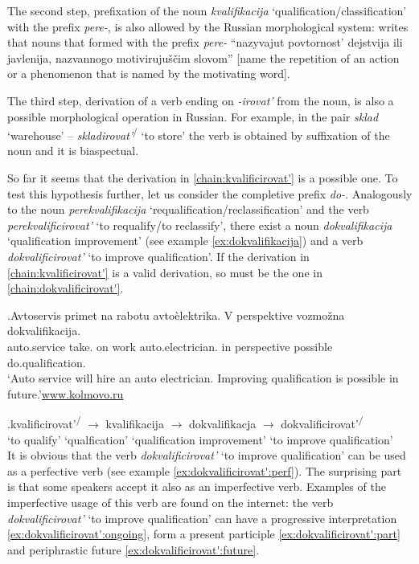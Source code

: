 The second step, prefixation of the noun \textit{kvalifikacija} `qualification\slash classifica\-tion' with the prefix \textit{pere-}, is also allowed by the Russian morphological system: \citet[226]{Shvedova:82} writes that nouns that formed with the prefix \textit{pere-} ``nazyvajut povtornost' dejstvija ili javlenija, nazvannogo motiviruju\v{s}\v{c}im slovom'' [name the repetition of an action or a phenomenon that is named by the motivating word].

The third step, derivation of a verb ending on \textit{-irovat'} from the noun, is also a possible morphological operation in Russian. For example, in the pair \textit{sklad} `warehouse' -- \textit{skladirovat'}\textsuperscript{\PF\slash\IPF} `to store' the verb is obtained by suffixation of the noun and it is biaspectual.

So far it seems that the derivation in \ref{chain:kvalificirovat'} is a possible one. To test this hypothesis further, let us consider the completive prefix \textit{do-}. Analogously to the noun \textit{perekvalifikacija} `requalification/reclassification' and the verb \textit{perekvalificirovat'} `to requalify/to reclassify', there exist a noun \textit{dokvalifikacija} `qualification improvement' (see example \ref{ex:dokvalifikacija}) and a verb \textit{dokvalificirovat'} `to improve qualification'. If the derivation in \ref{chain:kvalificirovat'} is a valid derivation, so must be the one in \ref{chain:dokvalificirovat'}.

\exg.\label{ex:dokvalifikacija}Avtoservis primet na rabotu avto\`{e}lektrika. V perspektive vozmo\v{z}na dokvalifikacija.\\
{auto.service} take. on work {auto.electrician.} in perspective possible do.qualification.\\
\trans `Auto service will hire an auto electrician. Improving qualification is possible in future.'\hbox{}\hfill\hbox{\url{www.kolmovo.ru}}

\exg.\label{chain:dokvalificirovat'}kvalificirovat'\textsuperscript{\PF\slash\IPF} {$\rightarrow$} kvalifikacija {$\rightarrow$} dokvalifikacja {$\rightarrow$} dokvalificirovat'\textsuperscript{\PF\slash\IPF}\\
{`to qualify'} {} {`qualfication'} {} {`qualification improvement'} {} {`to improve qualification'}\\

It is obvious that the verb \textit{dokvalificirovat'} `to improve qualification' can be used as a perfective verb (see example \ref{ex:dokvalificirovat':perf}). The surprising part is that some speakers accept it also as an imperfective verb. Examples of the imperfective usage of this verb are found on the internet: the verb \textit{dokvalificirovat'} `to improve qualification' can have a progressive interpretation \ref{ex:dokvalificirovat':ongoing}, form a present participle \ref{ex:dokvalificirovat':part} and periphrastic future \ref{ex:dokvalificirovat':future}. 

